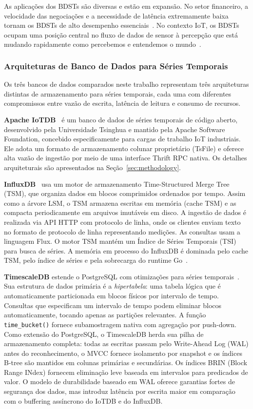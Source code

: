 As aplicações dos BDSTs são diversas e estão em expansão. No setor financeiro, a velocidade das
negociações e a necessidade de latência extremamente baixa tornam os BDSTs de alto desempenho
essenciais~\citep{Dunning2014}. No contexto IoT, os BDSTs ocupam uma posição central no fluxo de
dados de sensor à percepção que está mudando rapidamente como percebemos e entendemos o
mundo~\citep{Dunning2014}.

\subsubsection{Arquiteturas de Banco de Dados para Séries Temporais}

Os três bancos de dados comparados neste trabalho representam três arquiteturas distintas de
armazenamento para séries temporais, cada uma com diferentes compromissos entre vazão de escrita,
latência de leitura e consumo de recursos.

\textbf{Apache IoTDB}~\citep{wang2023iotdb} é um banco de dados de séries temporais de código
aberto, desenvolvido pela Universidade Tsinghua e mantido pela Apache Software Foundation,
concebido especificamente para cargas de trabalho IoT industriais. Ele adota um formato de
armazenamento colunar proprietário (TsFile) e oferece alta vazão de ingestão por meio de uma
interface Thrift RPC nativa. Os detalhes arquiteturais são apresentados na
Seção~\ref{sec:methodology}.

\textbf{InfluxDB}~\citep{naqvi2017influxdb} usa um motor de armazenamento Time-Structured Merge
Tree (TSM), que organiza dados em blocos comprimidos ordenados por tempo. Assim como a árvore
LSM, o TSM armazena escritas em memória (cache TSM) e as compacta periodicamente em arquivos
imutáveis em disco. A ingestão de dados é realizada via API HTTP com protocolo de linha, onde
os clientes enviam texto no formato de protocolo de linha representando medições. As consultas
usam a linguagem Flux. O motor TSM mantém um Índice de Séries Temporais (TSI) para busca de
séries. A memória em processo do InfluxDB é dominada pelo cache TSM, pelo índice de séries e
pela sobrecarga do runtime Go~\citep{naqvi2017influxdb}.

\textbf{TimescaleDB} estende o PostgreSQL com otimizações para séries temporais~\citep{timescaledb}.
Sua estrutura de dados primária é a \textit{hipertabela}: uma tabela lógica que é
automaticamente particionada em blocos físicos por intervalo de tempo. Consultas que
especificam um intervalo de tempo podem eliminar blocos automaticamente, tocando apenas as
partições relevantes. A função \texttt{time\_bucket()} fornece subamostragem nativa com
agregação por push-down. Como extensão do PostgreSQL, o TimescaleDB herda sua pilha de
armazenamento completa: todas as escritas passam pelo Write-Ahead Log (WAL) antes do
reconhecimento, o MVCC fornece isolamento por snapshot e os índices B-tree são mantidos em
colunas primárias e secundárias. Os índices BRIN (Block Range INdex) fornecem eliminação leve
baseada em intervalos para predicados de valor. O modelo de durabilidade baseado em WAL
oferece garantias fortes de segurança dos dados, mas introduz latência por escrita maior em
comparação com o buffering assíncrono do IoTDB e do InfluxDB.

